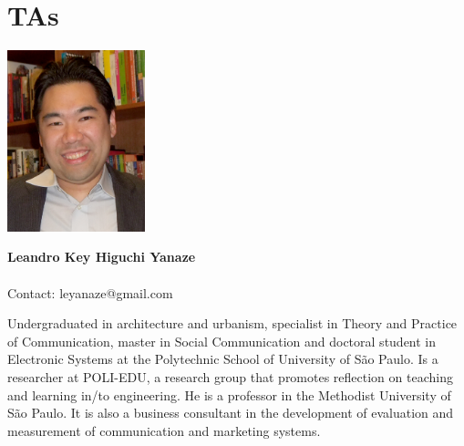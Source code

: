 \section{TAs}
\noindent \includegraphics[width=40mm]{images/foto_leandro.jpg}
\parbox[b]{0.6\textwidth}{\textbf{Leandro Key Higuchi Yanaze}\\ \\
Contact: leyanaze@gmail.com
}

Undergraduated in architecture and urbanism, specialist in Theory and Practice of Communication, master in Social Communication and doctoral student in Electronic Systems at the Polytechnic School of University of São Paulo. Is a researcher at POLI-EDU, a research group that promotes reflection on teaching and learning  in/to engineering. He is a professor in the Methodist University of São Paulo. It is also a business consultant in the development of evaluation and measurement of communication and marketing systems.
\\


